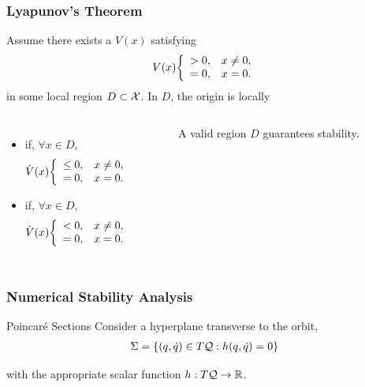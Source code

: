 \begin{frame}
  \frametitle{Lyapunov's Theorem}
  Assume there exists a  $V(x)$ satisfying
  \begin{align*}
    V(x) \bigg\{\begin{array}{l l}
      > 0,& x \ne 0,\\
      = 0,& x = 0.
    \end{array}
  \end{align*}
  in some local region $D \subset \mathcal{X}$. In $D$, the origin is locally
  \begin{columns}
    \column{2.5in}
    
    \begin{itemize}
    \item {} if, $\forall x \in D$,
      \begin{align*}
        {\dot V}(x) \bigg\{\begin{array}{l l}
        \leq 0,& x \ne 0,\\
        = 0,& x = 0.
        \end{array}
      \end{align*}
    \item {} if, $\forall x \in D$,
      \begin{align*}
        {\dot V}(x) \bigg\{\begin{array}{l l}
        < 0,& x \ne 0,\\
        = 0,& x = 0.
        \end{array}
      \end{align*}
    \end{itemize}
    \column{1.5in}
    \begin{figure}
      \centering
      \def\svgwidth{0.75\columnwidth}
      
      \caption{A valid region $D$ guarantees stability.}
    \end{figure}
  \end{columns}
\end{frame}

\begin{frame}
  \frametitle{Numerical Stability Analysis}
  \begin{block}{Poincar\'e Sections}
    Consider a hyperplane transverse to the orbit,
    \begin{align*}
      \Sigma = \left\{ (q, {\dot q}) \in T\mathcal{Q} : h(q, \dot q) = 0\right\}
    \end{align*}
  \end{block}
  with the appropriate scalar function $h : T\mathcal{Q} \to \mathbb{R}$.
\end{frame}
